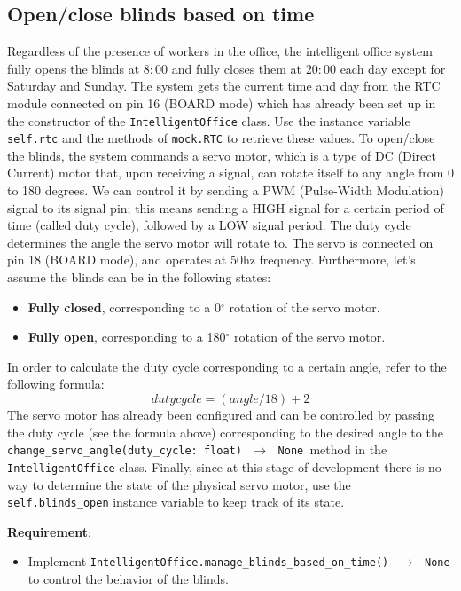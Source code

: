 \subsection*{Open/close blinds based on time}
Regardless of the presence of workers in the office, the intelligent office system fully opens the blinds at $8:00$ and fully closes them at $20:00$ each day except for Saturday and Sunday.
The system gets the current time and day from the RTC module connected on pin 16 (BOARD mode) which has already been set up in the constructor of  the \texttt{IntelligentOffice} class. Use the instance variable \texttt{self.rtc} and the methods of \texttt{mock.RTC} to retrieve these values.
To open/close the blinds, the system commands a servo motor, which is a type of DC (Direct Current) motor that, upon receiving a signal, can rotate itself to any angle from 0 to 180 degrees. We can control it by sending a PWM (Pulse-Width Modulation) signal to its signal pin; this means sending a HIGH signal for a certain period of time (called duty cycle), followed by a LOW signal period. The duty cycle determines the angle the servo motor will rotate to.
The servo is connected on pin 18 (BOARD mode), and operates at 50hz frequency. Furthermore, let's assume the blinds can be in the following states:
\begin{itemize}
    \item \textbf{Fully closed}, corresponding to a 0$^{\circ}$ rotation of the servo motor.
    \item \textbf{Fully open}, corresponding to a 180$^{\circ}$ rotation of the servo motor.
\end{itemize}

In order to calculate the duty cycle corresponding to a certain angle, refer to the following formula:
\[
    duty cycle = (angle / 18) + 2
\]
The servo motor has already been configured and can be controlled by passing the duty cycle (see the formula above) corresponding to the desired angle to the \texttt{change\_servo\_angle(duty\_cycle: float) $\,\to\,$ None }method in the \texttt{IntelligentOffice} class.
Finally, since at this stage of development there is no way to determine the state of the physical servo motor, use the \texttt{self.blinds\_open} instance variable to keep track of its state.

\noindent\textbf{Requirement}:
\begin{itemize}
    \item Implement \texttt{IntelligentOffice.manage\_blinds\_based\_on\_time() $\,\to\,$ None} to control the behavior of the blinds.
\end{itemize}


